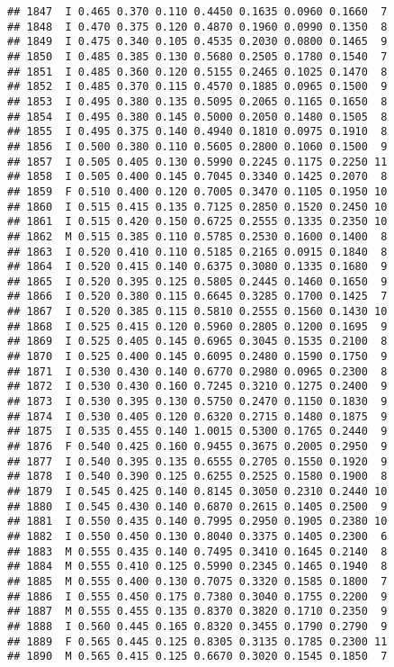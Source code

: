 \documentclass[
]{article}
\begin{document}
\begin{verbatim}
## 1847  I 0.465 0.370 0.110 0.4450 0.1635 0.0960 0.1660  7
## 1848  I 0.470 0.375 0.120 0.4870 0.1960 0.0990 0.1350  8
## 1849  I 0.475 0.340 0.105 0.4535 0.2030 0.0800 0.1465  9
## 1850  I 0.485 0.385 0.130 0.5680 0.2505 0.1780 0.1540  7
## 1851  I 0.485 0.360 0.120 0.5155 0.2465 0.1025 0.1470  8
## 1852  I 0.485 0.370 0.115 0.4570 0.1885 0.0965 0.1500  9
## 1853  I 0.495 0.380 0.135 0.5095 0.2065 0.1165 0.1650  8
## 1854  I 0.495 0.380 0.145 0.5000 0.2050 0.1480 0.1505  8
## 1855  I 0.495 0.375 0.140 0.4940 0.1810 0.0975 0.1910  8
## 1856  I 0.500 0.380 0.110 0.5605 0.2800 0.1060 0.1500  9
## 1857  I 0.505 0.405 0.130 0.5990 0.2245 0.1175 0.2250 11
## 1858  I 0.505 0.400 0.145 0.7045 0.3340 0.1425 0.2070  8
## 1859  F 0.510 0.400 0.120 0.7005 0.3470 0.1105 0.1950 10
## 1860  I 0.515 0.415 0.135 0.7125 0.2850 0.1520 0.2450 10
## 1861  I 0.515 0.420 0.150 0.6725 0.2555 0.1335 0.2350 10
## 1862  M 0.515 0.385 0.110 0.5785 0.2530 0.1600 0.1400  8
## 1863  I 0.520 0.410 0.110 0.5185 0.2165 0.0915 0.1840  8
## 1864  I 0.520 0.415 0.140 0.6375 0.3080 0.1335 0.1680  9
## 1865  I 0.520 0.395 0.125 0.5805 0.2445 0.1460 0.1650  9
## 1866  I 0.520 0.380 0.115 0.6645 0.3285 0.1700 0.1425  7
## 1867  I 0.520 0.385 0.115 0.5810 0.2555 0.1560 0.1430 10
## 1868  I 0.525 0.415 0.120 0.5960 0.2805 0.1200 0.1695  9
## 1869  I 0.525 0.405 0.145 0.6965 0.3045 0.1535 0.2100  8
## 1870  I 0.525 0.400 0.145 0.6095 0.2480 0.1590 0.1750  9
## 1871  I 0.530 0.430 0.140 0.6770 0.2980 0.0965 0.2300  8
## 1872  I 0.530 0.430 0.160 0.7245 0.3210 0.1275 0.2400  9
## 1873  I 0.530 0.395 0.130 0.5750 0.2470 0.1150 0.1830  9
## 1874  I 0.530 0.405 0.120 0.6320 0.2715 0.1480 0.1875  9
## 1875  I 0.535 0.455 0.140 1.0015 0.5300 0.1765 0.2440  9
## 1876  F 0.540 0.425 0.160 0.9455 0.3675 0.2005 0.2950  9
## 1877  I 0.540 0.395 0.135 0.6555 0.2705 0.1550 0.1920  9
## 1878  I 0.540 0.390 0.125 0.6255 0.2525 0.1580 0.1900  8
## 1879  I 0.545 0.425 0.140 0.8145 0.3050 0.2310 0.2440 10
## 1880  I 0.545 0.430 0.140 0.6870 0.2615 0.1405 0.2500  9
## 1881  I 0.550 0.435 0.140 0.7995 0.2950 0.1905 0.2380 10
## 1882  I 0.550 0.450 0.130 0.8040 0.3375 0.1405 0.2300  6
## 1883  M 0.555 0.435 0.140 0.7495 0.3410 0.1645 0.2140  8
## 1884  M 0.555 0.410 0.125 0.5990 0.2345 0.1465 0.1940  8
## 1885  M 0.555 0.400 0.130 0.7075 0.3320 0.1585 0.1800  7
## 1886  I 0.555 0.450 0.175 0.7380 0.3040 0.1755 0.2200  9
## 1887  M 0.555 0.455 0.135 0.8370 0.3820 0.1710 0.2350  9
## 1888  I 0.560 0.445 0.165 0.8320 0.3455 0.1790 0.2790  9
## 1889  F 0.565 0.445 0.125 0.8305 0.3135 0.1785 0.2300 11
## 1890  M 0.565 0.415 0.125 0.6670 0.3020 0.1545 0.1850  7

\end{verbatim}
\end{document}
